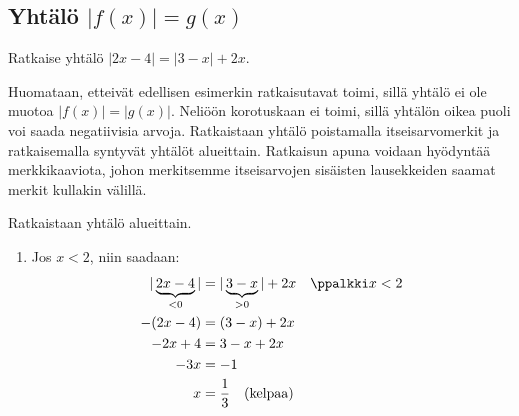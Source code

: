 \subsection*{Yhtälö $|f(x)|=g(x)$}

\begin{esimerkki}
	Ratkaise yhtälö $|2x-4|=|3-x|+2x$.
	\begin{esimratk}
		Huomataan, etteivät edellisen esimerkin ratkaisutavat toimi, sillä yhtälö ei ole muotoa $|f(x)|=|g(x)|$. Neliöön korotuskaan ei toimi, sillä yhtälön oikea puoli voi saada negatiivisia arvoja. Ratkaistaan yhtälö poistamalla itseisarvomerkit ja ratkaisemalla syntyvät yhtälöt alueittain. Ratkaisun apuna voidaan hyödyntää merkkikaaviota, johon merkitsemme itseisarvojen sisäisten lausekkeiden saamat merkit kullakin välillä.

		\begin{lukusuora}{0}{4}{4}
		\end{lukusuora}
		\begin{lukusuora}{1}{5}{4}
		\end{lukusuora}
		
		\begin{center}
			\begin{merkkikaavio}{2}

				\merkkikaavioMerkki{$-$}
				\merkkikaavioMerkki{$+$}
				\merkkikaavioMerkki{$+$}

			\merkkikaavioUusirivi
				\merkkikaavioMerkki{$+$}
				\merkkikaavioMerkki{$+$}
				\merkkikaavioMerkki{$-$}
			\end{merkkikaavio}
		\end{center}
		
		Ratkaistaan yhtälö alueittain.
		\begin{enumerate}[(1.)]
			\item Jos $x<2$, niin saadaan:
				\begin{align*}
					|\underbrace{2x-4}_{<0}|&=|\underbrace{3-x}_{>0}|+2x \quad \ppalkki x<2  \\
					-(2x-4)&=(3-x)+2x \\
					-2x+4&=3-x+2x \\
					-3x &= -1 \\
					x &= \frac{1}{3} \quad \text{(kelpaa)}
				\end{align*}


\end{enumerate}
\end{esimratk}
\end{esimerkki}
